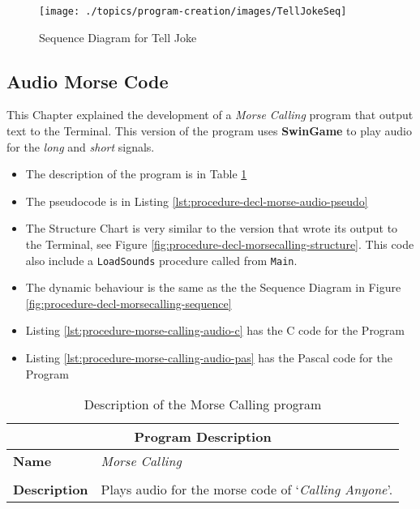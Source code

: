 \begin{figure}[p]
   \centering
   \texttt{[image: ./topics/program-creation/images/TellJokeSeq]} 
   \caption{Sequence Diagram for Tell Joke}
   \label{fig:procedure-decl-tell-joke-seq}
\end{figure}







\subsection{Audio Morse Code} %
\label{sub:audio_morse_code}

This Chapter explained the development of a \emph{Morse Calling} program that output text to the Terminal. This version of the program uses \textbf{SwinGame} to play audio for the \emph{long} and \emph{short} signals.
\begin{itemize}
  \item The description of the program is in Table \ref{tbl:procedure-decl-morse-audio}
  \item The pseudocode is in Listing \ref{lst:procedure-decl-morse-audio-pseudo}
  \item The Structure Chart is very similar to the version that wrote its output to the Terminal, see Figure \ref{fig:procedure-decl-morsecalling-structure}. This code also include a \texttt{LoadSounds} procedure called from \texttt{Main}.
  \item The dynamic behaviour is the same as the the Sequence Diagram in Figure \ref{fig:procedure-decl-morsecalling-sequence}
  \item Listing \ref{lst:procedure-morse-calling-audio-c} has the C code for the Program
  \item Listing \ref{lst:procedure-morse-calling-audio-pas} has the Pascal code for the Program
\end{itemize}

\begin{table}[h]
\centering
\begin{tabular}{l|p{10cm}}
  \hline
  \multicolumn{2}{c}{\textbf{Program Description}} \\
  \hline
  \textbf{Name} & \emph{Morse Calling} \\
  \\
  \textbf{Description} & Plays audio for the morse code of `\emph{Calling Anyone}'. \\
  \hline
\end{tabular}
\caption{Description of the Morse Calling program}
\label{tbl:procedure-decl-morse-audio}
\end{table}

